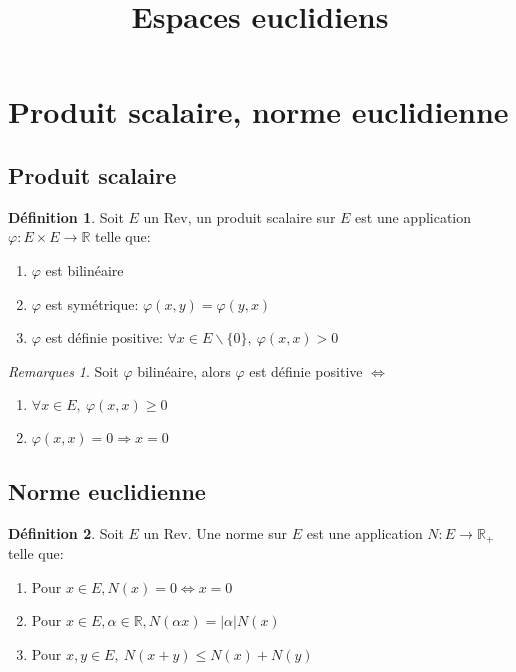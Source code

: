 \documentclass[fleqn]{article}
\title{Espaces euclidiens}
\date{}
\theoremstyle{definition} \newtheorem*{defi}{D\'efinition}
\theoremstyle{definition} \newtheorem*{theo}{Th\'eor\`eme}
\theoremstyle{definition} \newtheorem*{coro}{Corollaire}
\theoremstyle{remark} \newtheorem*{rqs}{Remarques}
\theoremstyle{definition} \newtheorem*{prop}{Propri\'et\'e}
\begin{document}
\maketitle

\section{Produit scalaire, norme euclidienne}
\subsection{Produit scalaire}
\begin{defi} Soit $E$ un Rev, un produit scalaire sur $E$ est une application $\varphi : E \times E \rightarrow \mathbb{R}$ telle que:
\begin{enumerate}
	\item $\varphi$ est bilin\'eaire
	\item $\varphi$ est sym\'etrique: $\varphi(x,y) = \varphi(y,x)$
	\item $\varphi$ est d\'efinie positive: $\forall x \in E \backslash \{0\},\ \varphi(x,x) > 0$
\end{enumerate}
\end{defi}

\begin{rqs} Soit $\varphi$ bilin\'eaire, alors $\varphi$ est d\'efinie positive $\Leftrightarrow$ \begin{enumerate}
	\item $\forall x \in E,\ \varphi(x,x) \geq 0$
	\item $\varphi(x,x) = 0 \Rightarrow x = 0$
	\end{enumerate}
\end{rqs}

\subsection{Norme euclidienne}
\begin{defi} Soit $E$ un Rev. Une norme sur $E$ est une application $N:E \rightarrow \mathbb{R}_+$ telle que:
	\begin{enumerate}
		\item Pour $x \in E, N(x) = 0 \Leftrightarrow x = 0$
		\item Pour $x \in E, \alpha \in \mathbb{R}, N(\alpha x) = |\alpha| N(x)$
		\item Pour $x,y \in E,\ N(x+y) \leq N(x) + N(y)$
	\end{enumerate}
\end{defi}
\end{document}
